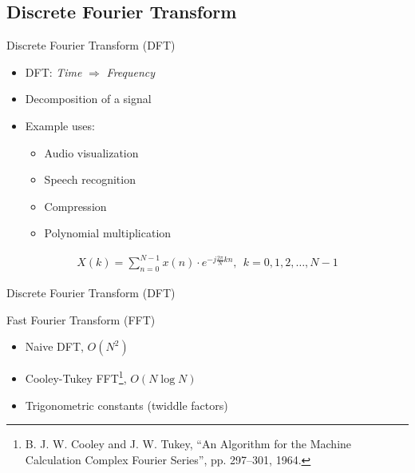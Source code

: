 \documentclass[xcolor={table}]{beamer}
\begin{document}
\subsection{Discrete Fourier Transform}
\begin{frame}{Discrete Fourier Transform (DFT)}
    \begin{itemize}
        \item DFT: \textit{Time} $\Rightarrow$ \textit{Frequency}
        \item Decomposition of a signal
        \item Example uses:
            \begin{itemize}
                \item Audio visualization
                \item Speech recognition
                \item Compression
                \item Polynomial multiplication
            \end{itemize}
    \end{itemize}

    \begin{align*}
        X\left(k\right) = \sum\limits_{n=0}^{N-1}x\left(n\right)\cdot e^{-j\frac{2\pi}{N}kn},\ \ k = 0,1,2,\dots,N-1
    \end{align*}
\end{frame}

\begin{frame}{Discrete Fourier Transform (DFT)}
    
\end{frame}

\begin{frame}{Fast Fourier Transform (FFT)}
    \begin{itemize}
        \item Naive DFT, $O(N^2)$
        \item Cooley-Tukey FFT\footnote{B. J. W. Cooley and J. W. Tukey, \enquote{An Algorithm for the Machine Calculation Complex Fourier Series}, pp. 297–301, 1964.}, $O(N\log{}N)$
        \item Trigonometric constants (twiddle factors)
    \end{itemize}
\end{frame}
%     
\end{document}
